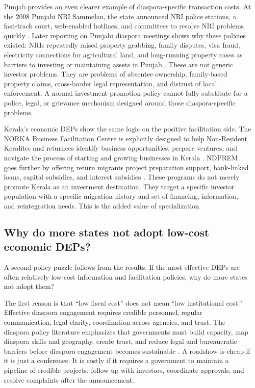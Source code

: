 \documentclass[12pt]{article}
\let\oldsubsection\subsection
\renewcommand{\subsection}{\FloatBarrier\oldsubsection}
\begin{document}
Punjab provides an even clearer example of diaspora-specific transaction costs. At the 2008 Punjabi NRI Sammelan, the state announced NRI police stations, a fast-track court, web-enabled hotlines, and committees to resolve NRI problems quickly \citep{jalandhar_punjab_india_special_nodate}. Later reporting on Punjabi diaspora meetings shows why these policies existed: NRIs repeatedly raised property grabbing, family disputes, visa fraud, electricity connections for agricultural land, and long-running property cases as barriers to investing or maintaining assets in Punjab \citep{pti_punjabi_2022}. These are not generic investor problems. They are problems of absentee ownership, family-based property claims, cross-border legal representation, and distrust of local enforcement. A normal investment-promotion policy cannot fully substitute for a police, legal, or grievance mechanism designed around those diaspora-specific problems.

Kerala's economic DEPs show the same logic on the positive facilitation side. The NORKA Business Facilitation Centre is explicitly designed to help Non-Resident Keralites and returnees identify business opportunities, prepare ventures, and navigate the process of starting and growing businesses in Kerala \citep{norka_nbfc_nodate}. NDPREM goes further by offering return migrants project preparation support, bank-linked loans, capital subsidies, and interest subsidies \citep{norka_ndprem_nodate}. These programs do not merely promote Kerala as an investment destination. They target a specific investor population with a specific migration history and set of financing, information, and reintegration needs. This is the added value of specialization.

\subsection{Why do more states not adopt low-cost economic DEPs?}

A second policy puzzle follows from the results. If the most effective DEPs are often relatively low-cost information and facilitation policies, why do more states not adopt them?

The first reason is that ``low fiscal cost'' does not mean ``low institutional cost.'' Effective diaspora engagement requires credible personnel, regular communication, legal clarity, coordination across agencies, and trust. The diaspora policy literature emphasizes that governments must build capacity, map diaspora skills and geography, create trust, and reduce legal and bureaucratic barriers before diaspora engagement becomes sustainable \citep{newland_developing_2012, ionescu_engaging_2006}. A roadshow is cheap if it is just a conference. It is costly if it requires a government to maintain a pipeline of credible projects, follow up with investors, coordinate approvals, and resolve complaints after the announcement.
\end{document}
